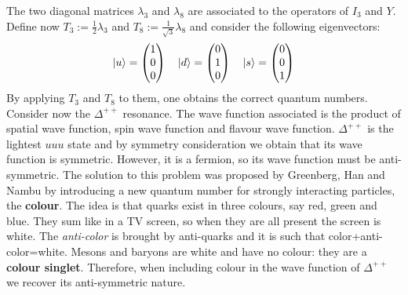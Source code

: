 \documentclass[10.75pt,a4paper,openright,bottom=2cm]{article}
\begin{document}
The two diagonal matrices $\lambda_3$ and $\lambda_8$ are associated to the operators of $I_3$ and $Y$.\\
Define now $T_3:=\frac{1}{2}\lambda_3$ and $T_8:=\frac{1}{\sqrt{3}}\lambda_8$ and consider the following eigenvectors:
\[
\ket{u}=\begin{pmatrix}
    1 \\ 0 \\ 0
\end{pmatrix} \quad \ket{d}=\begin{pmatrix}
    0 \\ 1 \\ 0
\end{pmatrix} \quad \ket{s}=\begin{pmatrix}
    0 \\ 0 \\ 1
\end{pmatrix}
\]
By applying $T_3$ and $T_8$ to them, one obtains the correct quantum numbers.\\
Consider now the $\Delta^{++}$ resonance. The wave function associated is the product of spatial wave function, spin wave function and flavour wave function. $\Delta^{++}$ is the lightest $uuu$ state and by symmetry consideration we obtain that its wave function is symmetric. However, it is a fermion, so its wave function must be anti-symmetric. The solution to this problem was proposed by Greenberg, Han and Nambu by introducing a new quantum number for strongly interacting particles, the \textbf{colour}. The idea is that quarks exist in three colours, say red, green and blue. They sum like in a TV screen, so when they are all present the screen is white. The \textit{anti-color} is brought by anti-quarks and it is such that color+anti-color=white. Mesons and baryons are white and have no colour: they are a \textbf{colour singlet}. Therefore, when including colour in the wave function of $\Delta^{++}$ we recover its anti-symmetric nature.
\newpage
\end{document}
